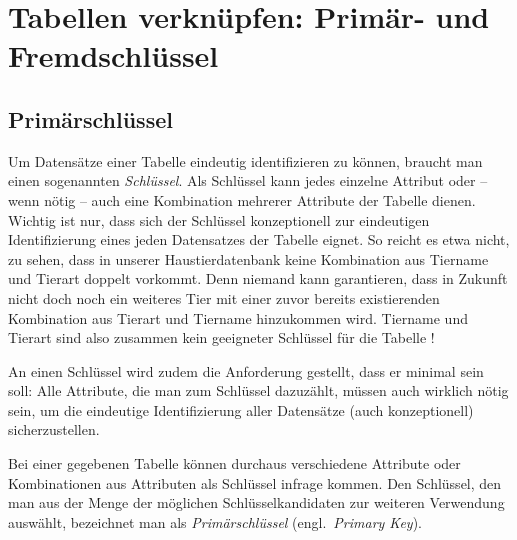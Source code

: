 \clearpage

\rehead[]{\textcolor{lightblue}{AvHG, Inf, My}}
\lohead[]{\textcolor{lightblue}{AvHG, Inf, My}}

\section{Tabellen verknüpfen: Primär- und Fremdschlüssel}

\subsection{Primärschlüssel}

Um Datensätze einer Tabelle eindeutig identifizieren zu können, braucht man
einen sogenannten \emph{Schlüssel}. Als Schlüssel kann jedes einzelne Attribut
oder -- wenn nötig -- auch eine Kombination mehrerer Attribute der Tabelle
dienen. Wichtig ist nur, dass sich der Schlüssel konzeptionell zur eindeutigen
Identifizierung eines jeden Datensatzes der Tabelle eignet. So reicht es etwa
nicht, zu sehen, dass in unserer Haustierdatenbank keine Kombination aus
Tiername und Tierart doppelt vorkommt. Denn niemand kann garantieren, dass in
Zukunft nicht doch noch ein weiteres Tier mit einer zuvor bereits
existierenden Kombination aus Tierart und Tiername hinzukommen wird. Tiername
und Tierart sind also zusammen kein geeigneter Schlüssel für die Tabelle
!

An einen Schlüssel wird zudem die Anforderung gestellt, dass er minimal sein
soll: Alle Attribute, die man zum Schlüssel dazuzählt, müssen auch wirklich
nötig sein, um die eindeutige Identifizierung aller Datensätze (auch
konzeptionell) sicherzustellen.

Bei einer gegebenen Tabelle können durchaus verschiedene Attribute oder
Kombinationen aus Attributen als Schlüssel infrage kommen. Den Schlüssel, den
man aus der Menge der möglichen Schlüsselkandidaten zur weiteren Verwendung
auswählt, bezeichnet man als \emph{Primärschlüssel} (engl.\ \emph{Primary Key}).

